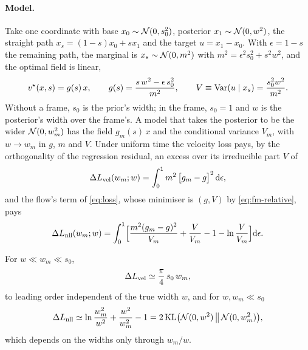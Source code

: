 \paragraph{Model.}
Take one coordinate with base $x_0\sim\mathcal{N}(0,s_0^2)$, posterior $x_1\sim\mathcal{N}(0,w^2)$, the
straight path $x_s = (1-s)x_0 + s x_1$ and the target $u = x_1 - x_0$. With $\epsilon=1-s$ the
remaining path, the marginal is $x_s\sim\mathcal{N}(0,m^2)$ with $m^2 = \epsilon^2s_0^2 + s^2w^2$, and
the optimal field is linear,
\begin{equation}
  v^\star(x,s) = g(s)\,x,\qquad
  g(s) = \frac{s\,w^2 - \epsilon\,s_0^2}{m^2},\qquad
  V \equiv \operatorname{Var}(u\mid x_s) = \frac{s_0^2w^2}{m^2}.
\end{equation}
Without a frame, $s_0$ is the prior's width; in the frame, $s_0=1$ and $w$ is the posterior's width
over the frame's. A model that takes the posterior to be the wider $\mathcal{N}(0,w_m^2)$ has the field
$g_m(s)\,x$ and the conditional variance $V_m$, with $w\to w_m$ in $g$, $m$ and $V$. Under uniform
time the velocity loss pays, by the orthogonality of the regression residual, an excess over its
irreducible part $V$ of
\begin{equation}
  \Delta L_{\rm vel}(w_m;w) = \int_0^1 m^2\,\bigl[g_m - g\bigr]^2\,\mathrm{d}\epsilon ,
  \label{eq:fm-excess}
\end{equation}
and the flow's term of \cref{eq:loss}, whose minimiser is $(g, V)$ by \cref{eq:fm-relative}, pays
\begin{equation}
  \Delta L_{\rm nll}(w_m;w) = \int_0^1 \Bigl[\frac{m^2(g_m-g)^2}{V_m}
  + \frac{V}{V_m} - 1 - \ln\frac{V}{V_m}\Bigr]\mathrm{d}\epsilon .
  \label{eq:fm-excess-nll}
\end{equation}

\begin{proposition}
\label{prop:fm-sensitivity}
For $w\ll w_m\ll s_0$,
\begin{equation}
  \Delta L_{\rm vel} \simeq \frac{\pi}{4}\,s_0\,w_m ,
  \label{eq:fm-sensitivity-uniform}
\end{equation}
to leading order independent of the true width $w$, and for $w,w_m\ll s_0$
\begin{equation}
  \Delta L_{\rm nll} \simeq \ln\frac{w_m^2}{w^2} + \frac{w^2}{w_m^2} - 1
  = 2\,\mathrm{KL}\bigl(\mathcal{N}(0,w^2)\,\big\|\,\mathcal{N}(0,w_m^2)\bigr),
  \label{eq:fm-sensitivity-nll}
\end{equation}
which depends on the widths only through $w_m/w$.
\end{proposition}

